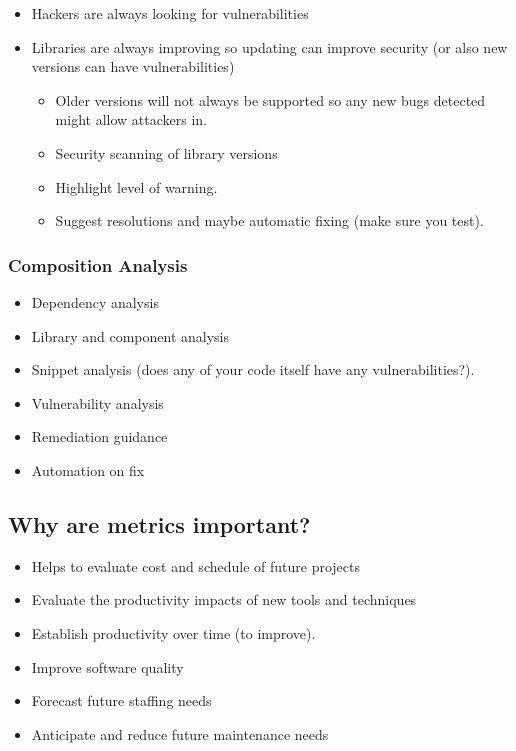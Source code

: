 \begin{itemize}
	\item Hackers are always looking for vulnerabilities
	\item Libraries are always improving so updating can improve security (or also new versions can have vulnerabilities)
	      \begin{itemize}
		      \item Older versions will not always be supported so any new bugs detected might allow attackers in.
		      \item Security scanning of library versions
		      \item Highlight level of warning.
		      \item Suggest resolutions and maybe automatic fixing (make sure you test).
	      \end{itemize}
\end{itemize}

\subsubsection{Composition Analysis}\label{ssub:composition_analysis}

\begin{itemize}
	\item Dependency analysis
	\item Library and component analysis
	\item Snippet analysis (does any of your code itself have any vulnerabilities?).
	\item Vulnerability analysis
	\item Remediation guidance
	\item Automation on fix
\end{itemize}

\subsection{Why are metrics important?}\label{sub:why_are_metrics_important_}

\begin{itemize}
	\item Helps to evaluate cost and schedule of future projects
	\item Evaluate the productivity impacts of new tools and techniques
	\item Establish productivity over time (to improve).
	\item Improve software quality
	\item Forecast future staffing needs
	\item Anticipate and reduce future maintenance needs
\end{itemize}


